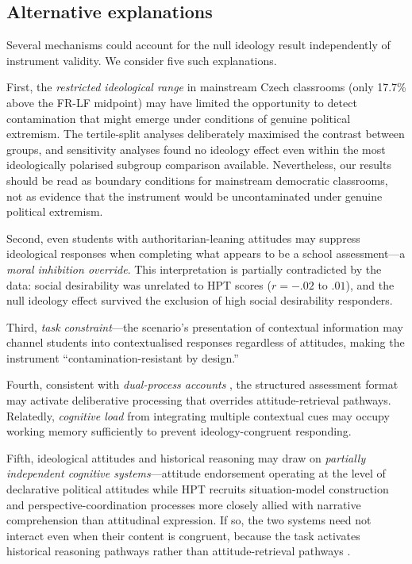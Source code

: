 \documentclass[pdflatex,sn-apa]{sn-jnl}%
\begin{document}
\subsection{Alternative explanations}\label{subsec:alternatives}

Several mechanisms could account for the null ideology result independently of instrument validity. We consider five such explanations.

First, the \emph{restricted ideological range} in mainstream Czech classrooms (only 17.7\% above the FR-LF midpoint) may have limited the opportunity to detect contamination that might emerge under conditions of genuine political extremism. The tertile-split analyses deliberately maximised the contrast between groups, and sensitivity analyses found no ideology effect even within the most ideologically polarised subgroup comparison available. Nevertheless, our results should be read as boundary conditions for mainstream democratic classrooms, not as evidence that the instrument would be uncontaminated under genuine political extremism.

Second, even students with authoritarian-leaning attitudes may suppress ideological responses when completing what appears to be a school assessment---a \emph{moral inhibition override}. This interpretation is partially contradicted by the data: social desirability was unrelated to HPT scores ($r = -.02$ to $.01$), and the null ideology effect survived the exclusion of high social desirability responders.

Third, \emph{task constraint}---the scenario's presentation of contextual information may channel students into contextualised responses regardless of attitudes, making the instrument ``contamination-resistant by design.''

Fourth, consistent with \emph{dual-process accounts} \citep{Evans2013}, the structured assessment format may activate deliberative processing that overrides attitude-retrieval pathways. Relatedly, \emph{cognitive load} from integrating multiple contextual cues may occupy working memory sufficiently to prevent ideology-congruent responding.

Fifth, ideological attitudes and historical reasoning may draw on \emph{partially independent cognitive systems}---attitude endorsement operating at the level of declarative political attitudes while HPT recruits situation-model construction and perspective-coordination processes more closely allied with narrative comprehension than attitudinal expression. If so, the two systems need not interact even when their content is congruent, because the task activates historical reasoning pathways rather than attitude-retrieval pathways \citep{Evans2013}.
\end{document}
